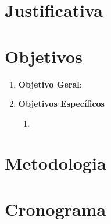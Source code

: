 \section*{Justificativa}

\section*{Objetivos}

\begin{enumerate}
	\item \textbf{Objetivo Geral}:

	\item \textbf{Objetivos Específicos}
	\begin{enumerate}
		\item 
	\end{enumerate}
\end{enumerate}

\section*{Metodologia}

\section*{Cronograma}
